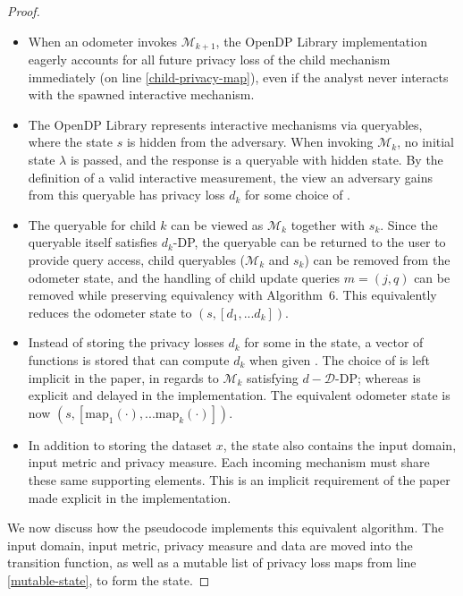 \documentclass{article}
\begin{document}
\begin{proof}
    \begin{itemize}
        \item When an odometer invokes $\mathcal{M}_{k+1}$, 
        the OpenDP Library implementation eagerly accounts for all future privacy loss of the child mechanism immediately (on line \ref{child-privacy-map}),
        even if the analyst never interacts with the spawned interactive mechanism.
        \item The OpenDP Library represents interactive mechanisms via queryables,
        where the state $s$ is hidden from the adversary. When invoking $\mathcal{M}_k$,
        no initial state $\lambda$ is passed, and the response is a queryable with hidden state.
        By the definition of a valid interactive measurement, the view an adversary gains from this queryable has privacy loss $d_k$
        for some choice of \din.
        \item The queryable for child $k$ can be viewed as $\mathcal{M}_k$ together with $s_k$.
        Since the queryable itself satisfies $d_k$-DP, the queryable can be returned to the user to provide query access, 
        child queryables ($\mathcal{M}_k$ and $s_k$) can be removed from the odometer state,
        and the handling of child update queries $m = (j, q)$ can be removed while preserving equivalency with Algorithm~6.
        This equivalently reduces the odometer state to $(s, [d_1, ... d_k])$.
        \item Instead of storing the privacy losses $d_k$ for some \din in the state,
        a vector of functions is stored that can compute $d_k$ when given \din.
        The choice of \din is left implicit in the paper, 
        in regards to $\mathcal{M}_k$ satisfying $d-\mathcal{D}$-DP;
        whereas \din is explicit and delayed in the implementation.
        The equivalent odometer state is now $(s, [\mathrm{map}_1(\cdot), ... \mathrm{map}_k(\cdot)])$.
        \item In addition to storing the dataset $x$, 
        the state also contains the input domain, input metric and privacy measure.
        Each incoming mechanism must share these same supporting elements.
        This is an implicit requirement of the paper made explicit in the implementation.
    \end{itemize}

    We now discuss how the pseudocode implements this equivalent algorithm.
    The input domain, input metric, privacy measure and data are moved into the transition function,
    as well as a mutable list of privacy loss maps from line \ref{mutable-state},
    to form the state.


\end{proof}
\end{document}
